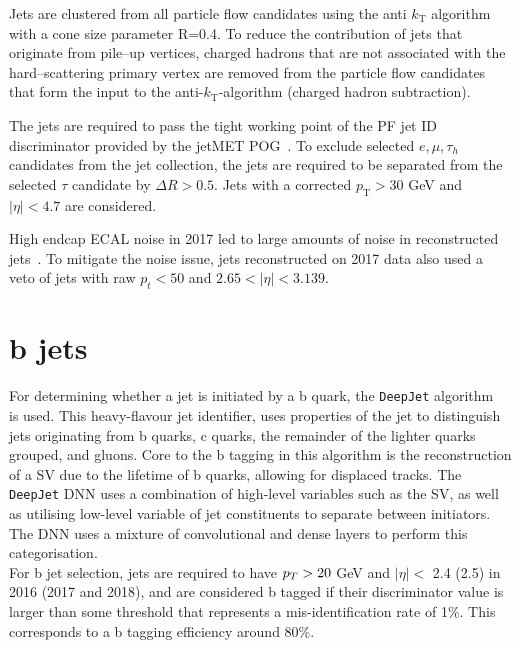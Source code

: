 Jets are clustered from all particle flow  candidates using the anti $k_{\text{T}}$ algorithm~\cite{Cacciari:2011ma} with a cone size parameter R=0.4. 
To reduce the contribution of jets that originate from pile--up vertices, charged hadrons that are not associated with the hard--scattering primary vertex are removed from the particle flow candidates 
that form the input to the anti-$k_{\text{T}}$-algorithm (charged hadron subtraction).

The jets are required to pass the tight working point of
the PF jet ID discriminator provided by the jetMET POG~\cite{PFJetID}.  
To exclude selected $e,\mu,\tau_{h}$ candidates from the jet collection, the jets
are required to be separated from the selected $\tau$ candidate by $\Delta R
> 0.5$.  Jets with a corrected $p_{\text{T}} > 30$ GeV and $|\eta|<4.7$ are
considered.

High endcap ECAL noise in 2017 led to large amounts of noise in reconstructed jets~\cite{JetTwiki}. To mitigate the noise issue,
jets reconstructed on 2017 data also used a veto of jets with
raw $p_{t} < 50$ and $2.65 < |\eta| < 3.139$. 

\section{b jets}

For determining whether a jet is initiated by a b quark, the \texttt{DeepJet} algorithm~\cite{CMS:2017wtu,Bols:2020bkb} is used.  
This heavy-flavour jet identifier, uses properties of the jet to distinguish jets originating from b quarks, c quarks, the remainder of the lighter quarks grouped, and gluons.
Core to the b tagging in this algorithm is the reconstruction of a \ac{SV} due to the lifetime of b quarks, allowing for displaced tracks.
The \texttt{DeepJet} \ac{DNN} uses a combination of high-level variables such as the \ac{SV}, as well as utilising low-level variable of jet constituents to separate between initiators.
The \ac{DNN} uses a mixture of convolutional and dense layers to perform this categorisation. \\

For b jet selection, jets are required to have $p_{T} > 20$ GeV and $|\eta| <$ 2.4 (2.5) in 2016 (2017 and 2018), and are considered b tagged if their discriminator value is larger than some threshold that represents a mis-identification rate of 1\%.
This corresponds to a b tagging efficiency around 80\%.

